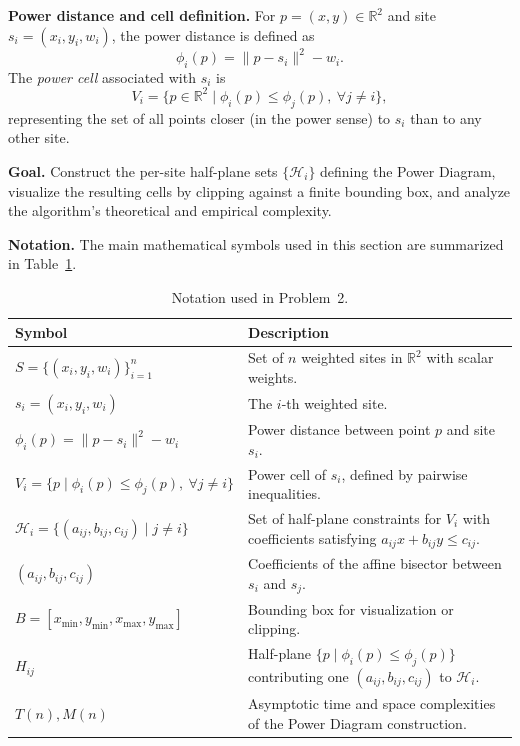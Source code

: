\documentclass{article}
\begin{document}
\textbf{Power distance and cell definition.}  
For $p=(x,y)\in\mathbb{R}^2$ and site $s_i=(x_i,y_i,w_i)$, the power distance is defined as
\[
\phi_i(p) = \|p - s_i\|^2 - w_i .
\]
The \emph{power cell} associated with $s_i$ is
\[
V_i = \{p \in \mathbb{R}^2 \mid \phi_i(p) \le \phi_j(p),\ \forall j \ne i\},
\]
representing the set of all points closer (in the power sense) to $s_i$ than to any other site.

\textbf{Goal.}  
Construct the per-site half-plane sets $\{\mathcal{H}_i\}$ defining the Power Diagram, visualize the resulting cells by clipping against a finite bounding box, and analyze the algorithm’s theoretical and empirical complexity.

\textbf{Notation.}  
The main mathematical symbols used in this section are summarized in Table~\ref{tab:notation2}.

\begin{table}[H]
\centering
\caption{Notation used in Problem~2.}
\label{tab:notation2}
\renewcommand{\arraystretch}{1.1}
\begin{tabular}{p{5.0cm} p{8.3cm}}
\hline
\textbf{Symbol} & \textbf{Description} \\
\hline
$S = \{(x_i, y_i, w_i)\}_{i=1}^n$ & Set of $n$ weighted sites in $\mathbb{R}^2$ with scalar weights. \\[2pt]
$s_i = (x_i, y_i, w_i)$ & The $i$-th weighted site. \\[2pt]
$\phi_i(p) = \|p - s_i\|^2 - w_i$ & Power distance between point $p$ and site $s_i$. \\[2pt]
$V_i = \{p \mid \phi_i(p) \le \phi_j(p),\ \forall j \ne i\}$ & Power cell of $s_i$, defined by pairwise inequalities. \\[2pt]
$\mathcal{H}_i = \{(a_{ij}, b_{ij}, c_{ij}) \mid j \ne i\}$ & Set of half-plane constraints for $V_i$ with coefficients satisfying $a_{ij}x + b_{ij}y \le c_{ij}$. \\[2pt]
$(a_{ij}, b_{ij}, c_{ij})$ & Coefficients of the affine bisector between $s_i$ and $s_j$. \\[2pt]
$B = [x_{\min}, y_{\min}, x_{\max}, y_{\max}]$ & Bounding box for visualization or clipping. \\[2pt]
$H_{ij}$ & Half-plane $\{p \mid \phi_i(p) \le \phi_j(p)\}$ contributing one $(a_{ij}, b_{ij}, c_{ij})$ to $\mathcal{H}_i$. \\[2pt]
$T(n), M(n)$ & Asymptotic time and space complexities of the Power Diagram construction. \\
\hline
\end{tabular}
\end{table}
\end{document}

